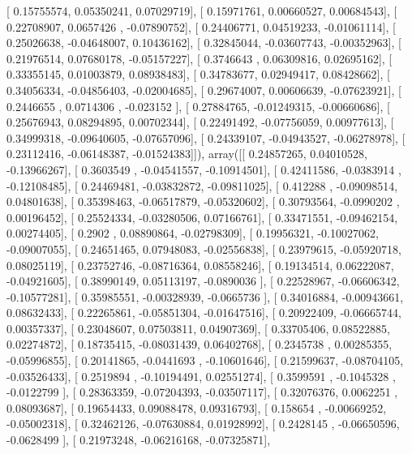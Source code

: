 \documentclass{article}
\begin{document}
       [ 0.15755574,  0.05350241,  0.07029719],
       [ 0.15971761,  0.00660527,  0.00684543],
       [ 0.22708907,  0.0657426 , -0.07890752],
       [ 0.24406771,  0.04519233, -0.01061114],
       [ 0.25026638, -0.04648007,  0.10436162],
       [ 0.32845044, -0.03607743, -0.00352963],
       [ 0.21976514,  0.07680178, -0.05157227],
       [ 0.3746643 ,  0.06309816,  0.02695162],
       [ 0.33355145,  0.01003879,  0.08938483],
       [ 0.34783677,  0.02949417,  0.08428662],
       [ 0.34056334, -0.04856403, -0.02004685],
       [ 0.29674007,  0.00606639, -0.07623921],
       [ 0.2446655 ,  0.0714306 , -0.023152  ],
       [ 0.27884765, -0.01249315, -0.00660686],
       [ 0.25676943,  0.08294895,  0.00702344],
       [ 0.22491492, -0.07756059,  0.00977613],
       [ 0.34999318, -0.09640605, -0.07657096],
       [ 0.24339107, -0.04943527, -0.06278978],
       [ 0.23112416, -0.06148387, -0.01524383]]), array([[ 0.24857265,  0.04010528, -0.13966267],
       [ 0.3603549 , -0.04541557, -0.10914501],
       [ 0.42411586, -0.0383914 , -0.12108485],
       [ 0.24469481, -0.03832872, -0.09811025],
       [ 0.412288  , -0.09098514,  0.04801638],
       [ 0.35398463, -0.06517879, -0.05320602],
       [ 0.30793564, -0.0990202 ,  0.00196452],
       [ 0.25524334, -0.03280506,  0.07166761],
       [ 0.33471551, -0.09462154,  0.00274405],
       [ 0.2902    ,  0.08890864, -0.02798309],
       [ 0.19956321, -0.10027062, -0.09007055],
       [ 0.24651465,  0.07948083, -0.02556838],
       [ 0.23979615, -0.05920718,  0.08025119],
       [ 0.23752746, -0.08716364,  0.08558246],
       [ 0.19134514,  0.06222087, -0.04921605],
       [ 0.38990149,  0.05113197, -0.0890036 ],
       [ 0.22528967, -0.06606342, -0.10577281],
       [ 0.35985551, -0.00328939, -0.0665736 ],
       [ 0.34016884, -0.00943661,  0.08632433],
       [ 0.22265861, -0.05851304, -0.01647516],
       [ 0.20922409, -0.06665744,  0.00357337],
       [ 0.23048607,  0.07503811,  0.04907369],
       [ 0.33705406,  0.08522885,  0.02274872],
       [ 0.18735415, -0.08031439,  0.06402768],
       [ 0.2345738 ,  0.00285355, -0.05996855],
       [ 0.20141865, -0.0441693 , -0.10601646],
       [ 0.21599637, -0.08704105, -0.03526433],
       [ 0.2519894 , -0.10194491,  0.02551274],
       [ 0.3599591 , -0.1045328 , -0.0122799 ],
       [ 0.28363359, -0.07204393, -0.03507117],
       [ 0.32076376,  0.0062251 ,  0.08093687],
       [ 0.19654433,  0.09088478,  0.09316793],
       [ 0.158654  , -0.00669252, -0.05002318],
       [ 0.32462126, -0.07630884,  0.01928992],
       [ 0.2428145 , -0.06650596, -0.0628499 ],
       [ 0.21973248, -0.06216168, -0.07325871],
\end{document}
